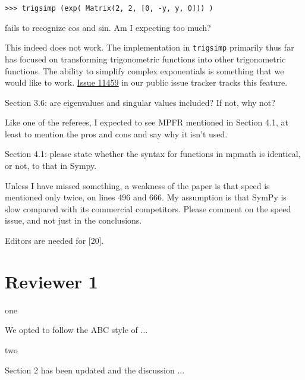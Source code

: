 \documentclass[answers,12pt]{exam}
\begin{document}
\begin{questions}
\begin{verbatim}
>>> trigsimp (exp( Matrix(2, 2, [0, -y, y, 0])) )
\end{verbatim}
fails to recognize cos and
sin. Am I expecting too much?
\begin{solution}
  This indeed does not work. The implementation in \verb|trigsimp| primarily
  thus far has focused on transforming trigonometric functions into other
  trigonometric functions. The ability to simplify complex exponentials is
  something that we would like to work.
  \href{https://github.com/sympy/sympy/issues/11459}{Issue 11459} in our
  public issue tracker tracks this feature.
\end{solution}
\question Section 3.6: are eigenvalues and singular
values included? If not, why not?
\begin{solution}
\end{solution}
\question Like one of the referees, I expected to
see MPFR mentioned in Section 4.1, at least to mention the pros and cons and
say why it isn’t used.
\begin{solution}
\end{solution}
\question Section 4.1: please state whether the syntax for
functions in mpmath is identical, or not, to that in Sympy.
\begin{solution}
\end{solution}
\question Unless I have
missed something, a weakness of the paper is that speed is mentioned only
twice, on lines 496 and 666. My assumption is that SymPy is slow compared with
its commercial competitors. Please comment on the speed issue, and not just in
the conclusions.
\begin{solution}
\end{solution}
\question Editors are needed for [20].
\begin{solution}
\end{solution}
\end{questions}

\section{Reviewer 1}

\begin{questions}
\question one
\begin{solution}
 We opted to follow the ABC style of ...
\end{solution}
\question  two
\begin{solution}
Section 2 has been updated and the discussion ...
\end{solution}
\end{questions}
\end{document}
